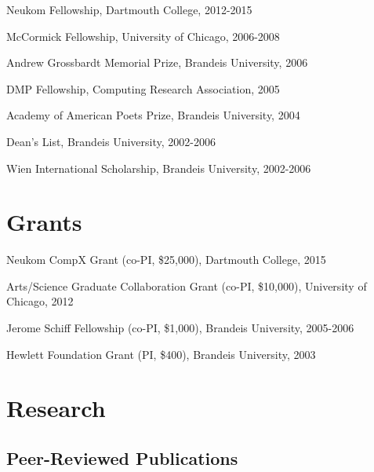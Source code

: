 \documentclass[10.5pt,letterpaper]{article}
\begin{document}
\begin{itemize*}
\item Neukom Fellowship, Dartmouth College, 2012-2015
\item McCormick Fellowship,  University of Chicago, 2006-2008
\item Andrew Grossbardt Memorial Prize, Brandeis University, 2006
\item DMP Fellowship, Computing Research Association, 2005
\item Academy of American Poets Prize, Brandeis University, 2004
\item Dean's List, Brandeis University, 2002-2006
\item Wien International Scholarship, Brandeis University, 2002-2006
\end{itemize*}


\section*{Grants}
%

\begin{itemize*}
\item Neukom CompX Grant (co-PI, \$25,000), Dartmouth College, 2015
\item Arts/Science Graduate Collaboration Grant (co-PI, \$10,000),  University of Chicago, 2012
\item Jerome Schiff Fellowship (co-PI, \$1,000), Brandeis University, 2005-2006
\item Hewlett Foundation  Grant (PI, \$400), Brandeis University, 2003
\end{itemize*}


\section*{Research}

\subsection*{Peer-Reviewed Publications}
\end{document}
